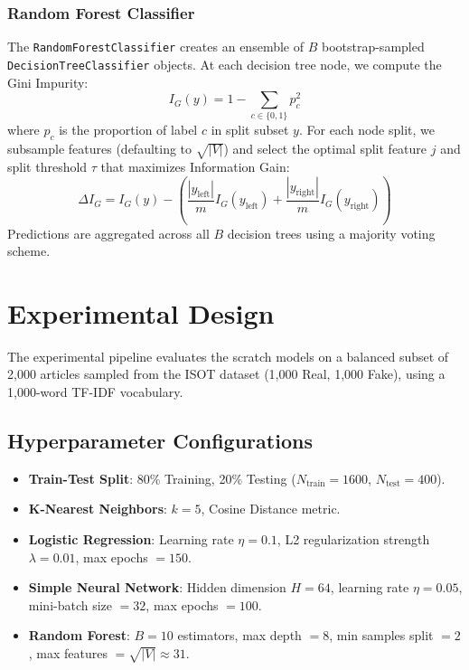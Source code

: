 \documentclass[conference]{IEEEtran}
\begin{document}
\subsubsection{Random Forest Classifier}
The \texttt{RandomForestClassifier} creates an ensemble of $B$ bootstrap-sampled \texttt{DecisionTreeClassifier} objects. At each decision tree node, we compute the Gini Impurity:
\begin{equation}
I_G(y) = 1 - \sum_{c \in \{0,1\}} p_c^2
\end{equation}
where $p_c$ is the proportion of label $c$ in split subset $y$. For each node split, we subsample features (defaulting to $\sqrt{|V|}$) and select the optimal split feature $j$ and split threshold $\tau$ that maximizes Information Gain:
\begin{equation}
\Delta I_G = I_G(y) - \left( \frac{|y_{\text{left}}|}{m} I_G(y_{\text{left}}) + \frac{|y_{\text{right}}|}{m} I_G(y_{\text{right}}) \right)
\end{equation}
Predictions are aggregated across all $B$ decision trees using a majority voting scheme.

\section{Experimental Design}
The experimental pipeline evaluates the scratch models on a balanced subset of 2,000 articles sampled from the ISOT dataset (1,000 Real, 1,000 Fake), using a 1,000-word TF-IDF vocabulary.

\subsection{Hyperparameter Configurations}
\begin{itemize}
\item \textbf{Train-Test Split}: 80\% Training, 20\% Testing ($N_{\text{train}} = 1600$, $N_{\text{test}} = 400$).
\item \textbf{K-Nearest Neighbors}: $k = 5$, Cosine Distance metric.
\item \textbf{Logistic Regression}: Learning rate $\eta = 0.1$, L2 regularization strength $\lambda = 0.01$, max epochs $= 150$.
\item \textbf{Simple Neural Network}: Hidden dimension $H = 64$, learning rate $\eta = 0.05$, mini-batch size $= 32$, max epochs $= 100$.
\item \textbf{Random Forest}: $B = 10$ estimators, max depth $= 8$, min samples split $= 2$, max features $= \sqrt{|V|} \approx 31$.
\end{itemize}
\end{document}

